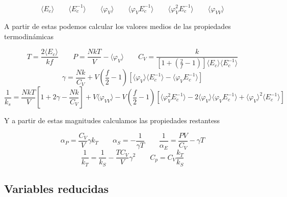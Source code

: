 \documentclass[11pt]{article} %
\newcommand{\parentesis}[1]{\left( #1  \right)}
\newcommand{\ccorchetes}[1]{\left[ #1  \right]}
\newcommand{\dquad}{\quad \quad}
\newcommand{\Ec}{\langle E_c \rangle}
\newcommand{\Ecinv}{\langle E_c^{-1} \rangle}
\newcommand{\varphiV}{\langle \varphi_V \rangle}
\newcommand{\varphiVV}{\langle \varphi_{VV}\rangle}
\newcommand{\varphiVEcinv}{\langle \varphi_V E_c^{-1} \rangle}
\newcommand{\varphiVVEcinv}{ \langle \varphi_V^2 E_c^{-1} \rangle}
\begin{document}
\begin{mybox}
	\begin{equation}
		\langle E_c \rangle \dquad \langle E_c^{-1} \rangle  \dquad \langle \varphi_V \rangle  \dquad \langle \varphi_V E_c^{-1} \rangle \dquad \langle \varphi_V^2 E_c^{-1} \rangle \dquad \langle \varphi_{VV}\rangle \label{Ec:02-01-30}
	\end{equation}
\end{mybox}	
A partir de estas podemos calcular los valores medios de las propiedades termodinámicas

\begin{mybox}
\begin{equation}
	 T = \frac{2\Ec}{kf} \dquad P = \frac{NkT}{V} - \langle \varphi_V \rangle \dquad C_V = \frac{k}{\ccorchetes{1+\parentesis{\frac{2}{f}-1}}\Ec \Ecinv}   \label{Ec:02-01-31}
\end{equation}
\begin{equation*}
	\gamma  = \frac{Nk}{C_V} + V \parentesis{\frac{f}{2} -1} \ccorchetes{\varphiV \Ecinv - \varphiVEcinv}  
\end{equation*}
\begin{equation*}
	\frac{1}{k_s} = \frac{NkT}{V} \ccorchetes{1+2\gamma - \frac{Nk}{C_V}} + V \varphiVV  - V\parentesis{\frac{f}{2} -1} \ccorchetes{\varphiVVEcinv - 2 \varphiV \varphiVEcinv + \varphiV^2 \Ecinv}
\end{equation*}
\end{mybox}	
Y a partir de estas magnitudes calculamos las propiedades restantess

\begin{mybox}
	\begin{equation}
		\alpha_P = \frac{C_V}{V} \gamma k_T \dquad \alpha_S = - \frac{1}{\gamma T} \dquad \frac{1}{\alpha_E} = \frac{PV}{C_V} - \gamma T \label{Ec:02-01-32}
	\end{equation}
	\begin{equation*}
		\frac{1}{k_T} = \frac{1}{k_S} - \frac{TC_V}{V} \gamma^2 \dquad C_p = C_V \frac{k_T}{k_S}
	\end{equation*}
\end{mybox}

\subsection{Variables reducidas}
\end{document}
